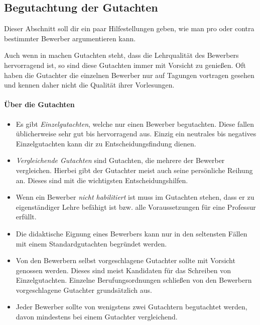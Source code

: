 \subsection{Begutachtung der Gutachten}
Dieser Abschnitt soll dir ein paar Hilfestellungen geben, wie man pro oder contra bestimmter Bewerber argumentieren kann.

Auch wenn in machen Gutachten steht, dass die Lehrqualität des Bewerbers hervorragend ist, so sind diese Gutachten immer mit Vorsicht zu genießen. Oft haben die Gutachter die einzelnen Bewerber nur auf Tagungen vortragen gesehen und kennen daher nicht die Qualität ihrer Vorlesungen.

\paragraph{Über die Gutachten}
\begin{itemize}
    \item Es gibt \emph{Einzelgutachten}, welche nur einen Bewerber begutachten. Diese fallen üblicherweise sehr gut bis hervorragend aus. Einzig ein neutrales bis negatives Einzelgutachten kann dir zu Entscheidungsfindung dienen.
    \item \emph{Vergleichende Gutachten} sind Gutachten, die mehrere der Bewerber vergleichen. Hierbei gibt der Gutachter meist auch seine persönliche Reihung an. Dieses sind mit die wichtigsten Entscheidungshilfen.
    \item Wenn ein Bewerber \emph{nicht habilitiert} ist muss im Gutachten stehen, dass er zu eigenständiger Lehre befähigt ist bzw. alle Voraussetzungen für eine Professur erfüllt.
    \item Die didaktische Eignung eines Bewerbers kann nur in den seltensten Fällen mit einem Standardgutachten begründet werden.
    \item Von den Bewerbern selbst vorgeschlagene Gutachter sollte mit Vorsicht genossen werden. Dieses sind meist Kandidaten für das Schreiben von Einzelgutachten. Einzelne Berufungsordnungen schließen von den Bewerbern vorgeschlagene Gutachter grundsätzlich aus.
    \item Jeder Bewerber sollte von wenigstens zwei Gutachtern begutachtet werden, davon mindestens bei einem Gutachter vergleichend.
\end{itemize}

